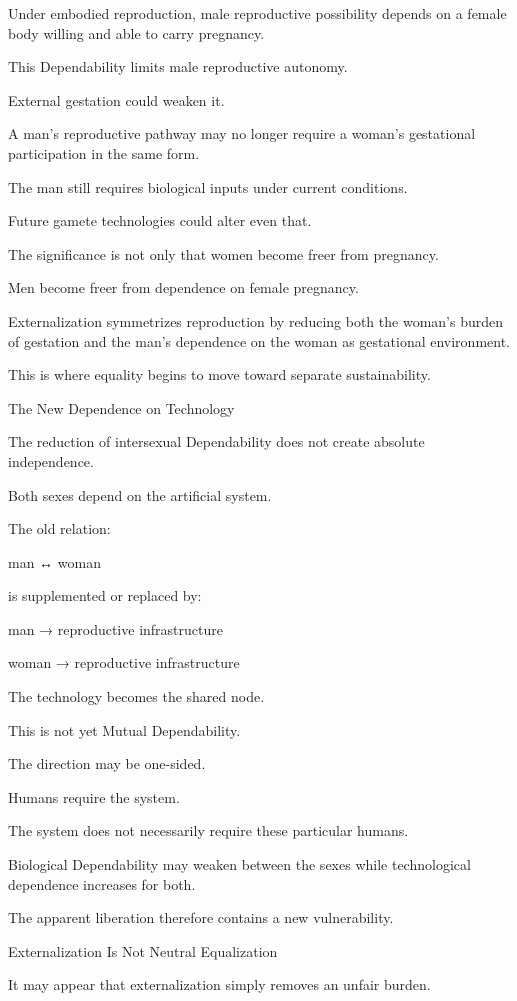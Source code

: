 Under embodied reproduction, male reproductive possibility depends on a female body willing and able to carry pregnancy.

This Dependability limits male reproductive autonomy.

External gestation could weaken it.

A man’s reproductive pathway may no longer require a woman’s gestational participation in the same form.

The man still requires biological inputs under current conditions.

Future gamete technologies could alter even that.

The significance is not only that women become freer from pregnancy.

Men become freer from dependence on female pregnancy.

Externalization symmetrizes reproduction by reducing both the woman’s burden of gestation and the man’s dependence on the woman as gestational environment.

This is where equality begins to move toward separate sustainability.

The New Dependence on Technology

The reduction of intersexual Dependability does not create absolute independence.

Both sexes depend on the artificial system.

The old relation:

man ↔ woman

is supplemented or replaced by:

man → reproductive infrastructure

woman → reproductive infrastructure

The technology becomes the shared node.

This is not yet Mutual Dependability.

The direction may be one-sided.

Humans require the system.

The system does not necessarily require these particular humans.

Biological Dependability may weaken between the sexes while technological dependence increases for both.

The apparent liberation therefore contains a new vulnerability.

Externalization Is Not Neutral Equalization

It may appear that externalization simply removes an unfair burden.

